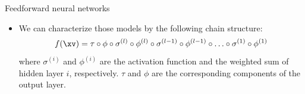 \begin{vbframe}{Feedforward neural networks}
\begin{itemize}
        \item We can characterize those models by the following chain structure: $$f(\xv) = \tau \circ \phi \circ \sigma^{(l)} \circ \phi^{(l)} \circ \sigma^{(l-1)} \circ \phi^{(l-1)} \circ \ldots \circ \sigma^{(1)} \circ \phi^{(1)}$$ where $\sigma^{(i)}$ and $\phi^{(i)}$ are the activation function and the weighted sum of hidden layer $i$, respectively. $\tau$ and $\phi$ are the corresponding components of the output layer.



\end{itemize}
\end{vbframe}
